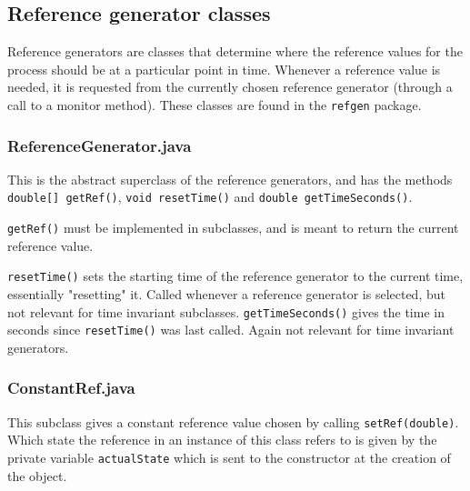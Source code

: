 






\subsection{Reference generator classes}
Reference generators are classes that determine where the reference values for the process should be at a particular point in time. 
Whenever a reference value is needed, it is requested from the currently chosen reference generator  (through a call to a monitor method). 
These classes are found in the \texttt{refgen} package.
 
\subsubsection{ReferenceGenerator.java}
This is the abstract superclass of the reference generators, and has the methods \texttt{double[] getRef()}, \texttt{void resetTime()} and \texttt{double getTimeSeconds()}.

\texttt{getRef()} must be implemented in subclasses, and is meant to return the current reference value.


\texttt{resetTime()} sets the starting time of the reference generator to the current time, essentially "resetting" it. 
Called whenever a reference generator is selected, but not relevant for time invariant subclasses.
\texttt{getTimeSeconds()} gives the time in seconds since \texttt{resetTime()} was last called. 
Again not relevant for time invariant generators.

\subsubsection{ConstantRef.java}
This subclass gives a constant reference value chosen by calling \texttt{setRef(double)}. 
Which state the reference in an instance of this class refers to is given by the private variable \texttt{actualState} which is sent to the constructor at the creation of the object.

%

